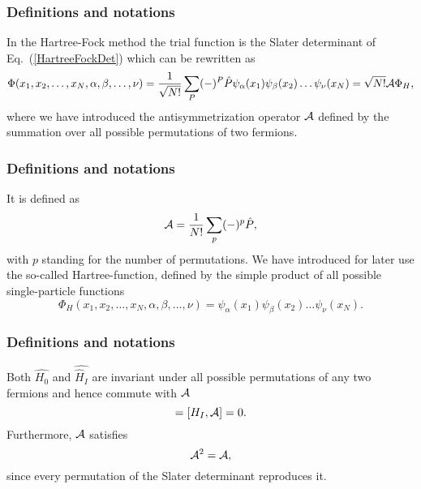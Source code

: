 \frame
{
  \frametitle{Definitions and notations}
\begin{small}
{\scriptsize
In the Hartree-Fock method the trial function is the Slater
determinant of Eq.~(\ref{HartreeFockDet}) which can be rewritten as 
\begin{equation}
  \Phi(x_1,x_2,\dots,x_N,\alpha,\beta,\dots,\nu) = \frac{1}{\sqrt{N!}}\sum_{P} (-)^P\hat{P}\psi_{\alpha}(x_1)
    \psi_{\beta}(x_2)\dots\psi_{\nu}(x_N)=\sqrt{N!}{\cal A}\Phi_H,
\label{HartreeFockPermutation}
\end{equation}
where we have introduced the antisymmetrization operator ${\cal A}$ defined by the 
summation over all possible permutations of two fermions.
}
\end{small}
}

\frame
{
  \frametitle{Definitions and notations}
\begin{small}
{\scriptsize
It is defined as
\begin{equation}
  {\cal A} = \frac{1}{N!}\sum_{p} (-)^p\hat{P},
\label{antiSymmetryOperator}
\end{equation}
with $p$ standing for the number of permutations. We have introduced for later use the so-called
Hartree-function, defined by the simple product of all possible single-particle functions
\begin{equation*}
  \Phi_H(x_1,x_2,\dots,x_N,\alpha,\beta,\dots,\nu) =
  \psi_{\alpha}(x_1)
    \psi_{\beta}(x_2)\dots\psi_{\nu}(x_N).
\end{equation*}

}
\end{small}
}

\frame
{
  \frametitle{Definitions and notations}
\begin{small}
{\scriptsize
Both $\hat{H_0}$ and $\hat{\hat{H}_I}$ are invariant under all possible permutations of any two fermions
and hence commute with ${\cal A}$
\begin{equation}
  [H_0,{\cal A}] = [H_I,{\cal A}] = 0.
  \label{cummutionAntiSym}
\end{equation}
Furthermore, ${\cal A}$ satisfies
\begin{equation}
  {\cal A}^2 = {\cal A},
  \label{AntiSymSquared}
\end{equation}
since every permutation of the Slater
determinant reproduces it. 
}
\end{small}
}

